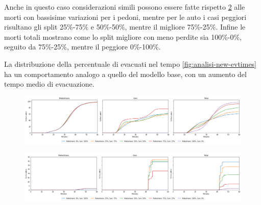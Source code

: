 Anche in questo caso considerazioni simili possono essere fatte rispetto \ref*{fig:analisi-new-casualties} alle morti con bassisime variazioni per i pedoni,
mentre per le auto i casi peggiori risultano gli split 25\%-75\% e 50\%-50\%, mentre il migliore 75\%-25\%.
Infine le morti totali mostrano come lo split migliore con meno perdite sia 100\%-0\%, seguito da 75\%-25\%, mentre il peggiore 0\%-100\%.

La distribuzione della percentuale di evacuati nel tempo \ref*{fig:analisi-new-evtimes} ha un comportamento analogo a quello del modello base, con un aumento del tempo medio di evacuazione.

\begin{figure}[ht]
    \centering
    \includegraphics[width=\textwidth]{images/analisi/new-evacuated.png}
    \caption{}
    \label{fig:analisi-new-evacuated}
\end{figure}

\begin{figure}[ht]
    \centering
    \includegraphics[width=\textwidth]{images/analisi/new-casualties.png}
    \caption{}
    \label{fig:analisi-new-casualties}
\end{figure}

